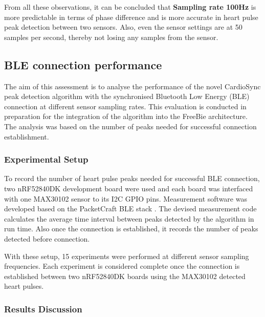 \noindent From all these observations, it can be concluded that \textbf{\textbf{Sampling rate 100Hz}} is more predictable in terms of phase difference and is more accurate in heart pulse peak detection between two sensors. Also, even the sensor settings are at 50 samples per second, thereby not losing any samples from the sensor.



\subsection{BLE connection performance}

\noindent The aim of this assessment is to analyse the performance of the novel CardioSync peak detection algorithm with the synchronised Bluetooth Low Energy (BLE) connection at different sensor sampling rates. This evaluation is conducted in preparation for the integration of the algorithm into the FreeBie architecture. The analysis was based on the number of peaks needed for successful connection establishment.

\subsubsection{Experimental Setup}
To record the number of heart pulse peaks needed for successful BLE connection, two nRF52840DK development board \cite{nRF52840} were used and each board was interfaced with one MAX30102 sensor \cite{2018MAX30102} to its I2C GPIO pins. Measurement software was developed based on the PacketCraft BLE stack \cite{2020Packetcraft}. The devised measurement code calculates the average time interval between peaks detected by the algorithm in run time. Also once the connection is established, it records the number of peaks detected before connection.
\vspace{1\baselineskip}

\noindent With these setup, 15 experiments were performed at different sensor sampling frequencies. Each experiment is considered complete once the connection is established between two nRF52840DK boards using the MAX30102 detected heart pulses.

\subsubsection{Results Discussion}


